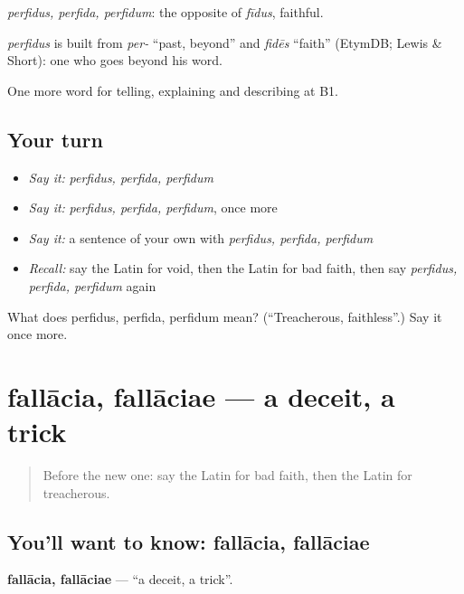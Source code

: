 \emph{perfidus, perfida, perfidum}: the opposite of \emph{fīdus}, faithful.

\begin{cousinweb}
\emph{perfidus} is built from \emph{per-} \textquotedblleft{}past, beyond\textquotedblright{} and \emph{fidēs} \textquotedblleft{}faith\textquotedblright{} (EtymDB; Lewis \& Short): one who goes beyond his word.
\end{cousinweb}

\begin{grammarlens}[title={What you've built}]
One more word for telling, explaining and describing at B1.
\end{grammarlens}

\subsection*{Your turn}
\begin{itemize}
\raggedright
  \item \emph{Say it:} \emph{perfidus, perfida, perfidum}
  \item \emph{Say it:} \emph{perfidus, perfida, perfidum}, once more
  \item \emph{Say it:} a sentence of your own with \emph{perfidus, perfida, perfidum}
  \item \emph{Recall:} say the Latin for void, then the Latin for bad faith, then say \emph{perfidus, perfida, perfidum} again
\end{itemize}

\begin{tcolorbox}[breakable,colback=teal!4,colframe=teal!35!black,title={Before you move on}]
What does perfidus, perfida, perfidum mean? (\textquotedblleft{}Treacherous, faithless\textquotedblright{}.) Say it once more.
\end{tcolorbox}
\section[fallācia, fallāciae]{fallācia, fallāciae — a deceit, a trick}

\label{lesson:LA-C399-fallacia}



\begin{quote}
Before the new one: say the Latin for bad faith, then the Latin for treacherous.
\end{quote}

\subsection*{You'll want to know: fallācia, fallāciae}
\textbf{fallācia, fallāciae} — \textquotedblleft{}a deceit, a trick\textquotedblright{}.

